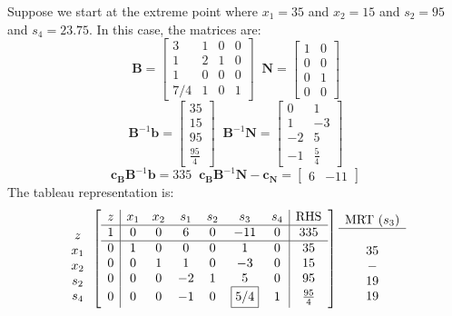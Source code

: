 \begin{example}
Suppose we start at the extreme point where $x_1 = 35$ and $x_2 = 15$ and $s_2 = 95$ and $s_4 = 23.75$. In this case, the matrices are:
\begin{displaymath}
\mathbf{B} = \begin{bmatrix}
3 & 	1 & 0 & 0\\
1 & 	2 & 1 & 0\\
1 & 	0 & 0 & 0\\
7/4 & 1 & 0 & 1
\end{bmatrix}\;\;
\mathbf{N} = \begin{bmatrix}
1 & 0\\
0 & 0\\
0 & 1\\
0 & 0
\end{bmatrix}
\end{displaymath}
\begin{displaymath}
\mathbf{B}^{-1}\mathbf{b} = \begin{bmatrix}
35\\
15\\
95\\
\frac{95}{4}
\end{bmatrix}\;\;
\mathbf{B}^{-1}\mathbf{N} = \begin{bmatrix}
0 & 1\\
1 & -3\\
-2 & 5\\
-1 & \frac{5}{4}
\end{bmatrix}
\end{displaymath}
\begin{displaymath}
\mathbf{c_B}\mathbf{B}^{-1}\mathbf{b} = 335\;\;
\mathbf{c_B}\mathbf{B}^{-1}\mathbf{N} - \mathbf{c_N} = \begin{bmatrix} 6 & -11\end{bmatrix}
\end{displaymath}
The tableau representation is:
\begin{equation}
\begin{array}{c}
\\
z\\
x_1\\
x_2\\
s_2\\
s_4
\end{array}
\left[
\begin{array}{c|cccccc|c}
z& x_1 & x_2 & s_1 & s_2 & s_3 & s_4 &\text{RHS}\\
\hline
1 & 0 & 0 & 6 & 0 & -11 & 0 & 335\\
\hline
0 & 1 & 0 & 0 & 0 & 1 & 0 & 35\\
0 & 0 & 1 & 1 & 0 & -3 & 0 & 15\\
0 & 0 & 0 & -2 & 1 & 5 & 0 & 95\\
0 & 0 & 0 & -1 & 0 & \fbox{5/4} & 1 & \frac{95}{4}
\end{array}\right]
\begin{array}{c}
\text{MRT ($s_3$)}\\
\hline
\\
35\\
-\\
19\\
19
\end{array}
\end{equation}


\end{example}
